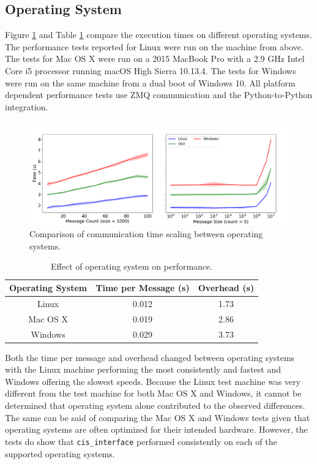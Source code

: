 \documentclass[journal]{IEEEtran}
\newcommand{\cis}{{\tt cis\_interface}{}}
\begin{document}
\subsection{Operating System}\label{SS:results_platform}
%
Figure \ref{fig:platform} and Table \ref{tab:platform} compare the execution times on different operating systems. The performance tests reported for Linux were run on the machine from above. The tests for Mac OS X were run on a 2015 MacBook Pro with a 2.9 GHz Intel Core i5 processor running macOS High Sierra 10.13.4. The tests for Windows were run on the same machine from a dual boot of Windows 10. All platform dependent performance tests use ZMQ communication and the Python-to-Python integration.
%
\ifinclfig
 	\begin{figure}[htbp]
	\begin{center}
	\includegraphics[width=\columnwidth,keepaspectratio]{./images/scaling_platform.png}
	\caption{Comparison of communication time scaling between operating systems.}
	\label{fig:platform}
	\end{center}
	\end{figure}
\fi
%
\begin{table}[htbp]
\begin{center}
\begin{tabular}{|c|c|c|}
\hline
Operating System	& Time per Message (s) 	& Overhead (s) 	\\\hline
Linux			& 0.012				& 1.73			\\
Mac OS X			& 0.019				& 2.86			\\
Windows			& 0.029				& 3.73			\\\hline
\end{tabular}
\end{center}
\caption{Effect of operating system on performance.}
\label{tab:platform}
\end{table}%
%
Both the time per message and overhead changed between operating systems with the Linux machine performing the most consistently and fastest and Windows offering the slowest speeds. Because the Linux test machine was very different from the test machine for both Mac OS X and Windows, it cannot be determined that operating system alone contributed to the observed differences. The same can be said of comparing the Mac OS X and Windows tests given that operating systems are often optimized for their intended hardware. However, the tests do show that {\cis} performed consistently on each of the supported operating systems.
\end{document}
